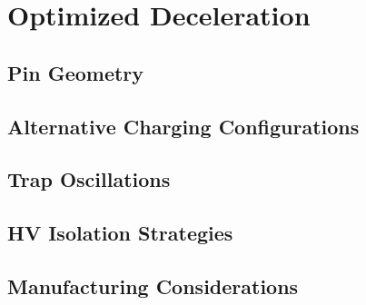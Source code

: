 \chapter{Optimized Deceleration}

\section{Pin Geometry}

\section{Alternative Charging Configurations}

\section{Trap Oscillations}

\section{HV Isolation Strategies}

\section{Manufacturing Considerations}